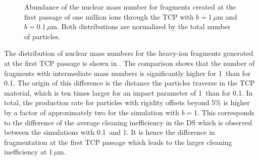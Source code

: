 \begin{figure}[t]
  \centering
  \caption{Abundance of the nuclear mass number for fragments created at the first passage of one million \lead ions through the TCP with $b=1\,\mu$m and $b=0.1\,\mu$m. Both distributions are normalized by the total number of particles.}  
  \label{pic:16081003}
  \end{figure}


The distribution of nuclear mass numbers for the heavy-ion fragments generated at the first TCP passage is shown in . The comparison shows that the number of fragments with intermediate mass numbers is significantly higher for 1\mum\, than for 0.1\mum. The origin of this difference is the distance the particles traverse in the TCP material, which is ten times larger for an impact parameter of 1\mum\, than for 0.1\mum. In total, the production rate for particles with rigidity offsets beyond 5\% is higher by a factor of approximately two for the simulation with $b=$1\mum. This corresponds to the difference of the average cleaning inefficiency in the DS which is observed between the simulations with 0.1\mum\, and 1\mum. It is hence the difference in fragmentation at the first TCP passage which leads to the larger cleaning inefficiency at 1$\,\mu$m.






